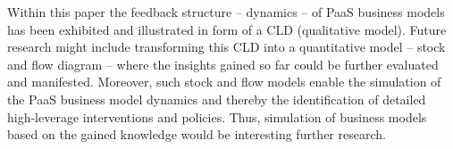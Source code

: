 Within this paper the feedback structure -- dynamics -- of PaaS business models has been exhibited and illustrated in form of a CLD (qualitative model). Future research might include transforming this CLD into a quantitative model -- stock and flow diagram -- where the insights gained so far could be further evaluated and manifested. Moreover, such stock and flow models enable the simulation of the PaaS business model dynamics and thereby the identification of detailed high-leverage interventions and policies. Thus, simulation of business models based on the gained knowledge would be interesting further research.
